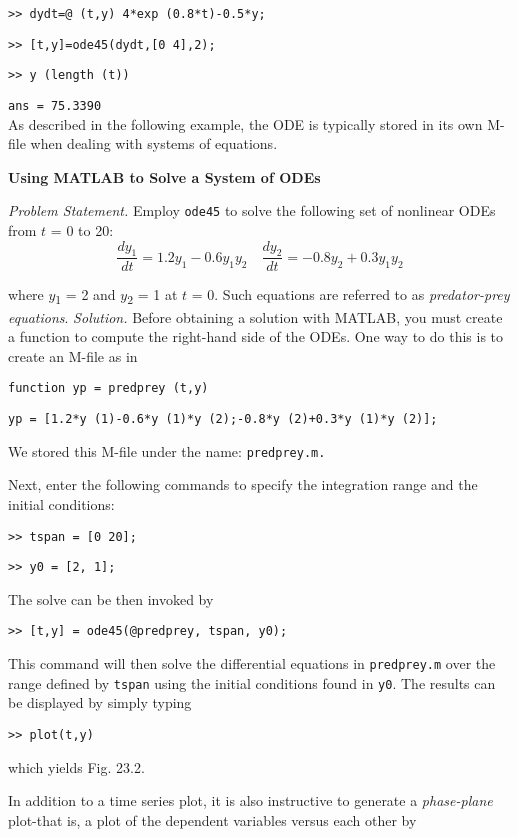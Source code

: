\documentclass[../main.tex]{subfiles}
\begin{document}
\texttt{>> dydt=@ (t,y) 4*exp (0.8*t)-0.5*y;}

\texttt{>> [t,y]=ode45(dydt,[0 4],2);}

\texttt{>> y (length (t))}


\texttt{ans = 75.3390}\\
As described in the following example, the ODE is typically stored in its own M-file when
dealing with systems of equations.

\begin{exmp} \textbf{Using MATLAB to Solve a System of ODEs}

    \noindent\textit{Problem Statement.} Employ \texttt{ode45} to solve the following set of nonlinear ODEs from $t$ = 0 to 20:
    \begin{equation}
        \frac{d y_{1}}{d t}=1.2 y_{1}-0.6 y_{1} y_{2} \quad \frac{d y_{2}}{d t}=-0.8 y_{2}+0.3 y_{1} y_{2}  \nonumber
    \end{equation}

\noindent where $y$\textsubscript{1} = 2 and $y$\textsubscript{2} = 1 at $t$ = 0. Such equations are referred to as \textit{predator-prey equations}.
\textit{Solution.} Before obtaining a solution with MATLAB, you must create a function to compute the right-hand side of the ODEs. One way to do this is to create an M-file as in

\texttt{function yp = predprey (t,y)}

\texttt{yp = [1.2*y (1)-0.6*y (1)*y (2);-0.8*y (2)+0.3*y (1)*y (2)];}

\noindent We stored this M-file under the name: \texttt{predprey.m.}

\noindent Next, enter the following commands to specify the integration range and the initial
conditions:

\texttt{>> tspan = [0 20];}

\texttt{>> y0 = [2, 1];}

\noindent The solve can be then invoked by

\texttt{>> [t,y] = ode45(@predprey, tspan, y0);}

\noindent This command will then solve the differential equations in \texttt{predprey.m} over the range
defined by \texttt{tspan} using the initial conditions found in \texttt{y0}. The results can be displayed by simply typing

\texttt{>> plot(t,y)}

\noindent which yields Fig. 23.2.

In addition to a time series plot, it is also instructive to generate a \textit{phase-plane} plot-that is, a plot of the dependent variables versus each other by


\end{exmp}
\end{document}
